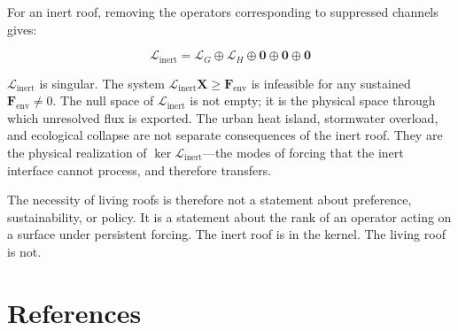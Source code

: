 \documentclass[12pt, a4paper]{article}
\theoremstyle{plain}
\theoremstyle{remark}
\begin{document}
For an inert roof, removing the operators corresponding to suppressed channels gives:

\begin{equation}
\mathcal{L}_{\text{inert}} = \mathcal{L}_G \oplus \mathcal{L}_H \oplus \mathbf{0} \oplus \mathbf{0} \oplus \mathbf{0}
\label{eq:operator_inert}
\end{equation}

\noindent $\mathcal{L}_{\text{inert}}$ is singular. The system $\mathcal{L}_{\text{inert}}\mathbf{X} \geq \mathbf{F}_{\text{env}}$ is infeasible for any sustained $\mathbf{F}_{\text{env}} \neq 0$. The null space of $\mathcal{L}_{\text{inert}}$ is not empty; it is the physical space through which unresolved flux is exported. The urban heat island, stormwater overload, and ecological collapse are not separate consequences of the inert roof. They are the physical realization of $\ker\mathcal{L}_{\text{inert}}$---the modes of forcing that the inert interface cannot process, and therefore transfers.

The necessity of living roofs is therefore not a statement about preference, sustainability, or policy. It is a statement about the rank of an operator acting on a surface under persistent forcing. The inert roof is in the kernel. The living roof is not.

\section*{References}
\end{document}
